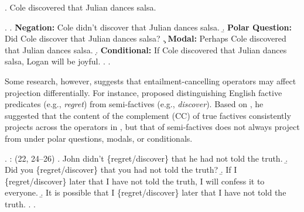 \documentclass[a4paper,12pt,twoside]{article}
\begin{document}
    
    \ex.\label{ex:simple} Cole discovered that Julian dances salsa.

	\ex. \label{ex:family}
		\a. \label{ex:neg}
			{\bf Negation:} \hfill
			Cole didn't discover that Julian dances salsa.
		\b. \label{ex:q}
			{\bf Polar Question:} \hfill
			Did Cole discover that Julian dances salsa?
		\c. \label{ex:mod}
			{\bf Modal:} \hfill
			Perhaps Cole discovered that Julian dances salsa.
		\d. \label{ex:cond}
			{\bf Conditional:} \hfill
			If Cole discovered that Julian dances salsa, Logan will be joyful.
		\z.
	\z.

    Some research, however, suggests that entailment-cancelling operators may affect projection differentially. For instance, \citet{karttunen_observations_1971} proposed distinguishing English factive predicates (e.g., \textit{regret}) from semi-factives (e.g., \textit{discover}). Based on \Next, he suggested that the content of the complement (CC) of true factives consistently projects across the operators in \Last, but that of semi-factives does not always project from under polar questions, modals, or conditionals.%


    \ex. \citealt{karttunen_observations_1971}: (22, 24--26)
        \a. John didn't \{regret/discover\} that he had not told the truth.
        \b. Did you \{regret/discover\} that you had not told the truth?
        \b. If I \{regret/discover\} later that I have not told the truth, I will confess it to everyone.
        \b. It is possible that I \{regret/discover\} later that I have not told the truth.
        \z.
    \z.
\end{document}
